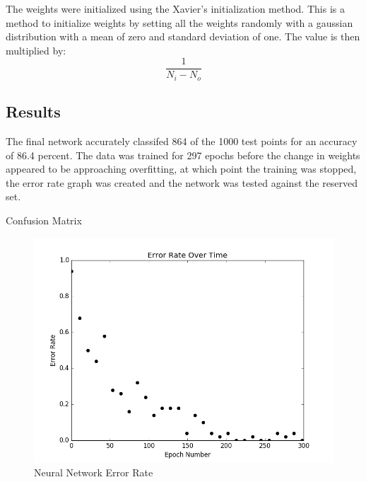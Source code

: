 \documentclass[12pt, letterpaper, twoside]{article}
\begin{document}
The weights were initialized using the Xavier's initialization method. This is a method to initialize weights
by setting all the weights randomly with a gaussian distribution with a mean of zero and standard 
deviation of one. The value is then multiplied by: 
\[
    \frac{ 1 } { N_i - N_o }    
\]



\subsection{Results}
The final network accurately classifed 864 of the 1000 test points for an accuracy of
86.4 percent. The data was trained for 297 epochs before the change in weights appeared to be approaching
overfitting, at which point the training was stopped, the error rate graph was created and the network was
tested against the reserved set. 



\begin{table}
    \centering
    \caption{Confusion Matrix}    
\end{table}

\begin{figure}
    \centering
    \includegraphics[scale=0.5]{NNErrorRate}
    \caption{Neural Network Error Rate}
\end{figure}
\end{document}
